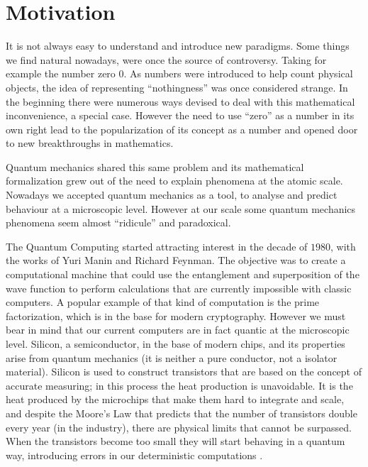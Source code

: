 \section{Motivation}
\label{sec:int_motivation}



It is not always easy to understand and introduce new paradigms. Some things we find natural nowadays, were once the source of controversy. Taking for example the number zero $0$. As numbers were introduced to help count physical objects, the idea of representing ``nothingness'' was once considered strange. In the beginning there were numerous ways devised to deal with this mathematical inconvenience, a special case. However the need to use ``zero'' as a number in its own right lead to the popularization of its concept as a number and opened door to new breakthroughs in mathematics\cite{Kaplan2000}. 

Quantum mechanics shared this same problem and its mathematical formalization grew out of the need to explain phenomena at the atomic scale\cite{Mehra1982}. Nowadays we  accepted quantum mechanics as a tool, to analyse and predict behaviour at a microscopic level. However at our scale some quantum mechanics phenomena seem almost ``ridicule'' and paradoxical.

The Quantum Computing started attracting interest in the decade of $1980$, with the works of Yuri Manin and Richard Feynman. The objective was to create a computational machine that could use the entanglement and superposition of the wave function to perform calculations that are currently impossible with classic computers. A popular example of that kind of computation is the prime factorization, which is in the base for modern cryptography. 
However we must bear in mind that our current computers are in fact quantic at the microscopic level. 
Silicon, a semiconductor, in the base of modern chips, and its properties arise from quantum mechanics (it is neither a pure conductor, not a isolator material). Silicon is used to construct transistors that are based on the concept of accurate measuring; in this process the heat production is unavoidable. It is the heat produced by the microchips that make them hard to integrate and scale, and despite the Moore's Law that predicts that the number of transistors double every year (in the industry), there are physical limits that cannot be surpassed. When the transistors become too small they will start behaving in a quantum way, introducing errors in our deterministic computations \cite{Laughlin2005}.







